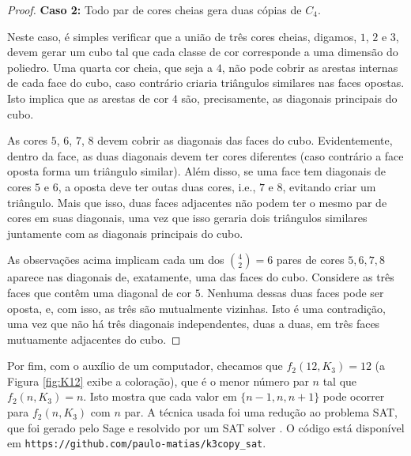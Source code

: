 \documentclass[11pt,twoside,a4paper]{book}
\theoremstyle{note}
\begin{document}
\begin{proof}
\medskip
\textbf{Caso 2:} Todo par de cores cheias gera duas cópias de $C_4$.

Neste caso, é simples verificar que a união de três cores cheias, digamos, $1$, $2$ e $3$, devem gerar um cubo  tal que cada classe de cor corresponde a uma dimensão do poliedro. Uma quarta cor cheia, que seja a $4$, não pode cobrir as arestas internas de cada face do cubo, caso contrário criaria triângulos similares nas faces opostas.
Isto implica que as arestas de cor $4$ são, precisamente, as diagonais principais do cubo.

As cores $5$, $6$, $7$, $8$ devem cobrir as diagonais das faces do cubo. Evidentemente, dentro da face, as duas diagonais devem ter cores diferentes (caso contrário a face oposta forma um triângulo similar).
Além disso, se uma face tem diagonais de cores $5$ e $6$, a oposta  deve ter outas duas cores, i.e., $7$ e $8$, evitando criar um triângulo. 
Mais que isso, duas faces adjacentes não podem ter o mesmo par de cores em suas diagonais, uma vez que isso geraria dois triângulos similares juntamente com as diagonais principais do cubo.

As observações acima implicam cada um dos $\binom{4}{2}=6$ pares de cores $5,6,7,8$ aparece nas diagonais de, exatamente, uma das faces do cubo.
Considere as três faces que contêm uma diagonal de cor $5$.
Nenhuma dessas duas faces pode ser oposta, e, com isso, as três são mutualmente vizinhas. Isto é uma contradição, uma vez que não há três diagonais independentes, duas a duas, em três faces mutuamente adjacentes do cubo.
\end{proof}

Por fim, com o auxílio de um computador, checamos que $f_2(12,K_3) = 12$ (a Figura \ref{fig:K12} exibe a coloração), que é o menor número par $n$ tal que $f_2(n,K_3) = n$. Isto mostra que cada valor em $\{n - 1, n, n + 1\}$ pode ocorrer para $f_2(n,K_3)$ com $n$ par.
A técnica usada foi uma redução ao problema SAT, que foi gerado pelo Sage \cite{sagemath} e resolvido por um SAT solver \cite{lingeling}. 
O código está disponível em   %
\texttt{https://github.com/paulo-matias/k3copy\_sat}.
\end{document}
